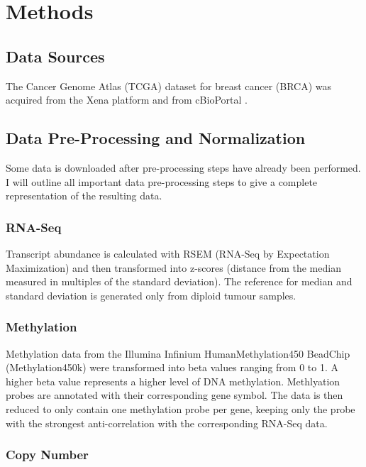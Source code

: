 \section{Methods}
\countem

\subsection{Data Sources}

The Cancer Genome Atlas (TCGA) dataset for breast cancer (BRCA)\cite{Ciriello2015} was acquired from the Xena platform \cite{Goldman2018} and from cBioPortal \cite{Cerami2012}.

\subsection{Data Pre-Processing and Normalization}

Some data is downloaded after pre-processing steps have already been performed.
I will outline all important data pre-processing steps to give a complete representation of the resulting data.

\subsubsection*{RNA-Seq}

Transcript abundance is calculated with RSEM (RNA-Seq by Expectation Maximization) and then transformed into z-scores (distance from the median measured in multiples of the standard deviation).
The reference for median and standard deviation is generated only from diploid tumour samples.

\subsubsection*{Methylation}

Methylation data from the Illumina Infinium HumanMethylation450 BeadChip (Methylation450k) were transformed into beta values ranging from 0 to 1.
A higher beta value represents a higher level of DNA methylation.
Methlyation probes are annotated with their corresponding gene symbol.
The data is then reduced to only contain one methylation probe per gene, keeping only the probe with the strongest anti-correlation with the corresponding RNA-Seq data.

\subsubsection*{Copy Number}

